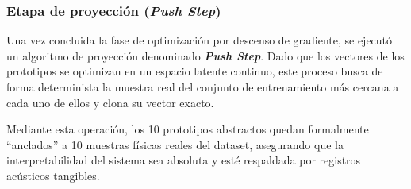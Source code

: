 \subsubsection*{Etapa de proyección (\textit{Push Step})}

Una vez concluida la fase de optimización por descenso de gradiente, se ejecutó un algoritmo de proyección denominado \textbf{\textit{Push Step}}. Dado que los vectores de los prototipos se optimizan en un espacio latente continuo, este proceso busca de forma determinista la muestra real del conjunto de entrenamiento más cercana a cada uno de ellos y clona su vector exacto. 

Mediante esta operación, los 10 prototipos abstractos quedan formalmente ``anclados'' a 10 muestras físicas reales del dataset, asegurando que la interpretabilidad del sistema sea absoluta y esté respaldada por registros acústicos tangibles.